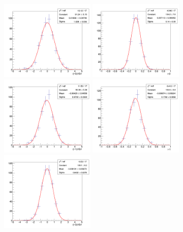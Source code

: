 \begin{figure}[!htb]
	\centering
	\includegraphics[width=0.4\textwidth]{Figures/signalInjection0_500_sigpull_1000wide.png}
	\includegraphics[width=0.4\textwidth]{Figures/signalInjection0_500_sigstrength_1000wide.png}
	\includegraphics[width=0.4\textwidth]{Figures/signalInjection1_500_sigpull_1000wide.png}
	\includegraphics[width=0.4\textwidth]{Figures/signalInjection1_500_sigstrength_1000wide.png}
	\includegraphics[width=0.4\textwidth]{Figures/signalInjection3_500_sigpull_1000wide.png}

\end{figure}
